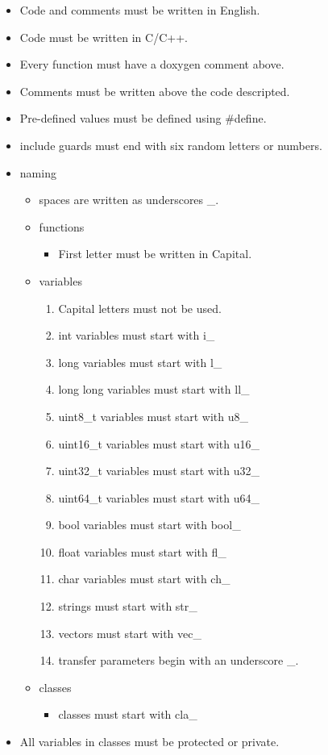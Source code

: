 \begin{itemize}
    \item Code and comments must be written in English.
    \item Code must be written in C/C++.
    \item Every function must have a doxygen comment above.
    \item Comments must be written above the code descripted.
    \item Pre-defined values must be defined using #define.
    \item include guards must end with six random letters or numbers.
    \item naming
    \begin{itemize}
        \item spaces are written as underscores _.
        \item functions
        \begin{itemize}
            \item First letter must be written in Capital.
        \end{itemize}
        \item variables
        \begin{enumerate}
            \item Capital letters must not be used.
            \item int variables must start with i_
            \item long variables must start with l_
            \item long long variables must start with ll_
            \item uint8_t variables must start with u8_
            \item uint16_t variables must start with u16_
            \item uint32_t variables must start with u32_
            \item uint64_t variables must start with u64_
            \item bool variables must start with bool_
            \item float variables must start with fl_
            \item char variables must start with ch_
            \item strings must start with str_
            \item vectors must start with vec_
            \item transfer parameters begin with an underscore _.
        \end{enumerate}
        \item classes
        \begin{itemize}
            \item classes must start with cla_
        \end{itemize}
    \end{itemize}
    \item All variables in classes must be protected or private.
\end{itemize}